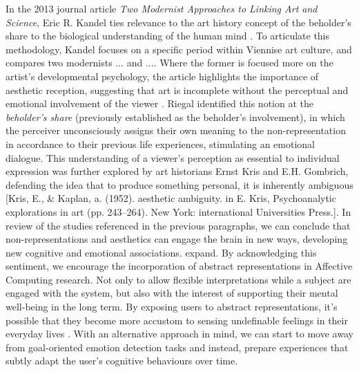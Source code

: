 In the 2013 journal article \textit{Two Modernist Approaches to Linking Art and Science}, Eric R. Kandel ties relevance to the art history concept of the beholder's share to the biological understanding of the human mind \cite{kandel_two_2013}. To articulate this methodology, Kandel focuses on a specific period within Viennise art culture, and compares two modernists ... and .... Where the former is focused more on the artist's developmental psychology, the article highlights the importance of aesthetic reception, suggesting that art is incomplete without the perceptual and emotional involvement of the viewer \cite{riegl_group_1999}. Riegal identified this notion at the \textit{beholder's share} (previously established as the beholder's involvement), in which the perceiver unconsciously assigns their own meaning to the non-representation in accordance to their previous life experiences, stimulating an emotional dialogue. This understanding of a viewer's perception as essential to individual expression was further explored by art historians Ernst Kris and E.H. Gombrich, defending the idea that to produce something personal, it is inherently ambiguous [Kris, E., \& Kaplan, a. (1952). aesthetic ambiguity. in E. Kris, Psychoanalytic explorations in art (pp. 243–264). New York: international Universities Press.]. 
In review of the studies referenced in the previous paragraphs, we can conclude that non-representations and aesthetics can engage the brain in new ways, developing new cognitive and emotional associations. {\color{red}expand}. By acknowledging this sentiment, we encourage the incorporation of abstract representations in Affective Computing research. Not only to allow flexible interpretations while a subject are engaged with the system, but also with the interest of supporting their mental well-being in the long term. By exposing users to abstract representations, it's possible that they become more accustom to sensing undefinable feelings in their everyday lives \cite{durkin_objective_2020}. With an alternative approach in mind, we can start to move away from goal-oriented emotion detection tasks and instead, prepare experiences that subtly adapt the user's cognitive behaviours over time. 

